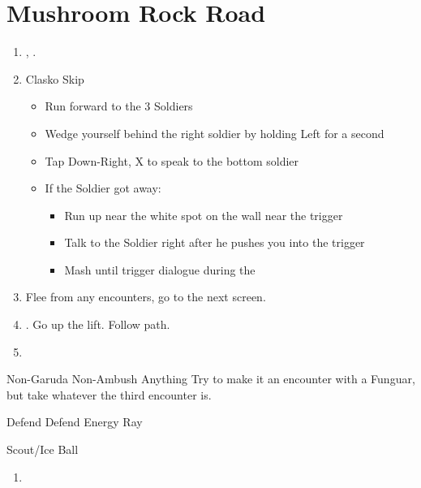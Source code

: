 \chapter{Mushroom Rock Road}

\begin{enumerate}
  \item \sd, \cs.
  \item Clasko Skip
  \begin{itemize}
  	\item Run forward to the 3 Soldiers
  	\item Wedge yourself behind the right soldier by holding Left for a second
  	\item Tap Down-Right, X to speak to the bottom soldier
  	\item If the Soldier got away:
  		\begin{itemize}
  			\item Run up near the white spot on the wall near the trigger
  			\item Talk to the Soldier right after he pushes you into the trigger
  			\item Mash until trigger dialogue during the \cs
		\end{itemize}
	\end{itemize}
  \item Flee from any encounters, go to the next screen.
  \item \save. Go up the lift. Follow path.
  \item \formation{\tidus}{\wakka}{\auron}
\end{enumerate}
\begin{battle}{Non-Garuda Non-Ambush Anything}
Try to make it an encounter with a Funguar, but take whatever the third encounter is.
  \begin{itemize}
    \switch{\tidus}{\kimahri}
    \kimahrif Defend
    \wakkaf Defend
    \switch{\auron}{\yuna}
    \summon{\valefor}
    \valeforf Energy Ray
  \end{itemize}
\end{battle}
\begin{equip}
\begin{itemize}
	\wakkaf Scout/Ice Ball
\end{itemize}
\end{equip}
\begin{enumerate}[resume]
  \item \formation{\tidus}{\wakka}{\auron}
\end{enumerate}
